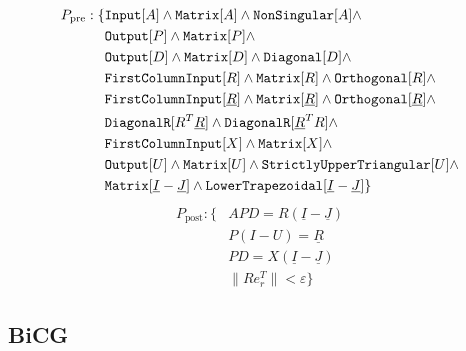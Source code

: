 %
\begin{align*}
P_\text{pre}: \{ &\text{\ttfamily Input}[A] \land \text{\ttfamily Matrix}[A] \land \text{\ttfamily NonSingular}[A] \land \\
		&\text{\ttfamily Output}[P] \land \text{\ttfamily Matrix}[P] \land \\
		&\text{\ttfamily Output}[D] \land \text{\ttfamily Matrix}[D] \land \text{\ttfamily Diagonal}[D] \land \\
		&\text{\ttfamily FirstColumnInput}[R] \land \text{\ttfamily Matrix}[R] \land \text{\ttfamily Orthogonal}[R] \land \\
		&\text{\ttfamily FirstColumnInput}[\underline{R}] \land \text{\ttfamily Matrix}[\underline{R}] \land \text{\ttfamily Orthogonal}[\underline{R}] \land \\
		&\text{\ttfamily DiagonalR}[R^T \underline{R}] \land \text{\ttfamily DiagonalR}[\underline{R}^T R] \land \\
		&\text{\ttfamily FirstColumnInput}[X] \land \text{\ttfamily Matrix}[X] \land \\
		&\text{\ttfamily Output}[U] \land \text{\ttfamily Matrix}[U] \land \text{\ttfamily StrictlyUpperTriangular}[U] \land \\
		& \text{\ttfamily Matrix}[\underline{I} - \underline{J}] \land \text{\ttfamily LowerTrapezoidal}[\underline{I} - \underline{J}] \}
\end{align*}
%
\begin{align*}
P_\text{post}:	\{ 	&APD = R \left( \underline{I} - \underline{J} \right) \\
				&P \left( I - U \right) = \underline{R} \\
				&PD = X \left( \underline{I} - \underline{J} \right) \\
				&\| R e_r^T \| < \varepsilon \}
\end{align*}

\subsection{BiCG}

